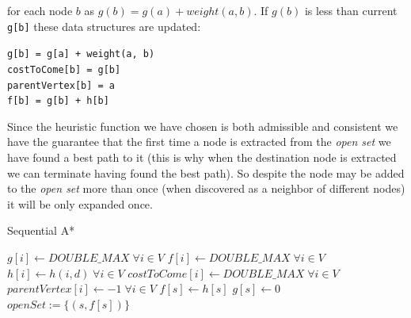 \documentclass[twocolumn, switch]{article} %
\begin{document}
for each node $b$ as $g(b) = g(a) + weight(a, b)$. If $g(b)$ is less than current \texttt{g[b]} these data structures
are updated: 
\begin{flushleft}
  \texttt{g[b] = g[a] + weight(a, b)}\\
  \texttt{costToCome[b] = g[b]}\\
  \texttt{parentVertex[b] = a}\\
  \texttt{f[b] = g[b] + h[b]}
\end{flushleft}
Since the heuristic function we have chosen is both admissible and consistent we have the guarantee 
that the first time a node is extracted from the \textit{open set} we have found a best path to it (this
is why when the destination node is extracted we can terminate having found the best path). So despite
the node may be added to the \textit{open set} more than once (when discovered as a neighbor of different nodes)
it will be only expanded once.
\begin{algorithm}[ht!] 
\caption{Sequential A*}\label{alg:two}
$g[i] \gets DOUBLE\_MAX \;\forall i \in V$\;
$f[i] \gets DOUBLE\_MAX \;\forall i \in V$\;
$h[i] \gets h(i, d) \; \forall i \in V$\;
$costToCome[i] \gets DOUBLE\_MAX \; \forall i \in V$\;
$parentVertex[i] \gets -1 \; \forall i \in V$\;
$f[s] \gets h[s]$\;
$g[s] \gets 0$\;
$openSet := \{(s, f[s])\}$\;
\end{algorithm}
\end{document}
